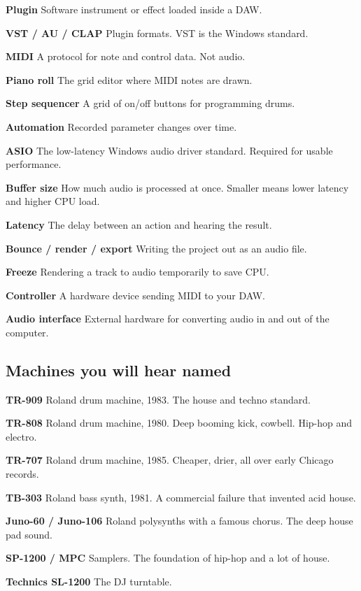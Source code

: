 \textbf{Plugin} Software instrument or effect loaded inside a DAW.

\textbf{VST / AU / CLAP} Plugin formats. VST is the Windows standard.

\textbf{MIDI} A protocol for note and control data. Not audio.

\textbf{Piano roll} The grid editor where MIDI notes are drawn.

\textbf{Step sequencer} A grid of on/off buttons for programming drums.

\textbf{Automation} Recorded parameter changes over time.

\textbf{ASIO} The low-latency Windows audio driver standard. Required for usable performance.

\textbf{Buffer size} How much audio is processed at once. Smaller means lower latency and higher
CPU load.

\textbf{Latency} The delay between an action and hearing the result.

\textbf{Bounce / render / export} Writing the project out as an audio file.

\textbf{Freeze} Rendering a track to audio temporarily to save CPU.

\textbf{Controller} A hardware device sending MIDI to your DAW.

\textbf{Audio interface} External hardware for converting audio in and out of the computer.

\subsection{Machines you will hear named}\label{th09_glossary-machines-you-will-hear-named}

\textbf{TR-909} Roland drum machine, 1983. The house and techno standard.

\textbf{TR-808} Roland drum machine, 1980. Deep booming kick, cowbell. Hip-hop and electro.

\textbf{TR-707} Roland drum machine, 1985. Cheaper, drier, all over early Chicago records.

\textbf{TB-303} Roland bass synth, 1981. A commercial failure that invented acid house.

\textbf{Juno-60 / Juno-106} Roland polysynths with a famous chorus. The deep house pad sound.

\textbf{SP-1200 / MPC} Samplers. The foundation of hip-hop and a lot of house.

\textbf{Technics SL-1200} The DJ turntable.

